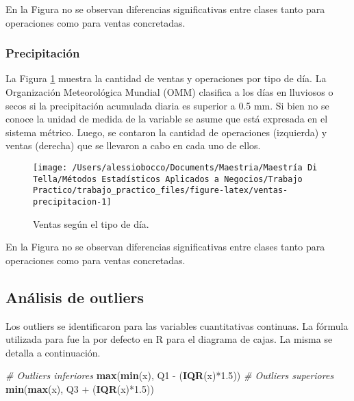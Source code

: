 \documentclass[
  12pt]{article}
\newenvironment{Shaded}{}{}
\newcommand{\CommentTok}[1]{\textcolor[rgb]{0.38,0.63,0.69}{\textit{#1}}}
\newcommand{\FloatTok}[1]{\textcolor[rgb]{0.25,0.63,0.44}{#1}}
\newcommand{\KeywordTok}[1]{\textcolor[rgb]{0.00,0.44,0.13}{\textbf{#1}}}
\newcommand{\NormalTok}[1]{#1}
\newcommand{\OperatorTok}[1]{\textcolor[rgb]{0.40,0.40,0.40}{#1}}
\newcommand{\StringTok}[1]{\textcolor[rgb]{0.25,0.44,0.63}{#1}}
\begin{document}
En la Figura no se observan diferencias significativas entre clases tanto para operaciones como para ventas concretadas.

\hypertarget{precipitaciuxf3n}{%
\subsubsection{Precipitación}\label{precipitaciuxf3n}}

La Figura \ref{fig:ventas-precipitacion} muestra la cantidad de ventas y operaciones por tipo de día. La Organización Meteorológica Mundial (OMM) clasifica a los días en lluviosos o secos si la precipitación acumulada diaria es superior a 0.5 mm. Si bien no se conoce la unidad de medida de la variable se asume que está expresada en el sistema métrico. Luego, se contaron la cantidad de operaciones (izquierda) y ventas (derecha) que se llevaron a cabo en cada uno de ellos.

\begin{figure}

{\centering \texttt{[image: /Users/alessiobocco/Documents/Maestria/Maestría Di Tella/Métodos Estadísticos Aplicados a Negocios/Trabajo Practico/trabajo\_practico\_files/figure-latex/ventas-precipitacion-1]} 

}

\caption{Ventas según el tipo de día.}\label{fig:ventas-precipitacion}
\end{figure}

En la Figura no se observan diferencias significativas entre clases tanto para operaciones como para ventas concretadas.

\hypertarget{anuxe1lisis-de-outliers}{%
\subsection{Análisis de outliers}\label{anuxe1lisis-de-outliers}}

Los outliers se identificaron para las variables cuantitativas continuas. La fórmula utilizada para fue la por defecto en R para el diagrama de cajas. La misma se detalla a continuación.

\begin{Shaded}
\begin{Highlighting}[]
\CommentTok{# Outliers inferiores}
\KeywordTok{max}\NormalTok{(}\KeywordTok{min}\NormalTok{(x), Q1 }\OperatorTok{-}\StringTok{ }\NormalTok{(}\KeywordTok{IQR}\NormalTok{(x)}\OperatorTok{*}\FloatTok{1.5}\NormalTok{))}
\CommentTok{# Outliers superiores}
\KeywordTok{min}\NormalTok{(}\KeywordTok{max}\NormalTok{(x), Q3 }\OperatorTok{+}\StringTok{ }\NormalTok{(}\KeywordTok{IQR}\NormalTok{(x)}\OperatorTok{*}\FloatTok{1.5}\NormalTok{)) }
\end{Highlighting}
\end{Shaded}
\end{document}
